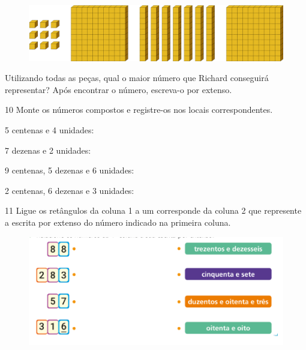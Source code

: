 \begin{figure}[htpb!]
\includegraphics[width=\textwidth]{./media/image4.png}
\end{figure}

Utilizando todas as peças, qual o maior número que Richard conseguirá
representar? Após encontrar o número, escreva-o por extenso.


\num{10} Monte os números compostos e registre-os nos locais correspondentes.

\begin{escolha}
\item 5 centenas e 4 unidades:

\reduline{504\hfill}

\item 7 dezenas e 2 unidades:

\reduline{72\hfill}

\item 9 centenas, 5 dezenas e 6 unidades:

\reduline{956\hfill}

\item 2 centenas, 6 dezenas e 3 unidades:

\reduline{263\hfill}

\end{escolha}

\pagebreak
\num{11} Ligue os retângulos da coluna 1 a um corresponde da coluna 2 que
represente a escrita por extenso do número indicado na primeira coluna.

\begin{figure}[htpb!]
\centering
\includegraphics[width=\textwidth]{./media/image5.png}
\end{figure}


